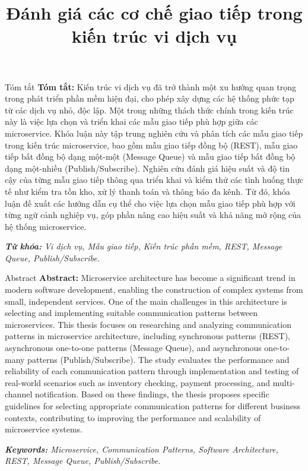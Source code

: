 \documentclass{uetgraduation}
\title{Đánh giá các cơ chế giao tiếp trong kiến trúc vi dịch vụ}
\begin{document}
\makecovers

\begin{preamble}{Tóm tắt}
    \textbf{Tóm tắt:} Kiến trúc vi dịch vụ đã trở thành  một xu hướng quan trọng trong phát triển phần mềm hiện đại, cho phép xây dựng các hệ thống phức tạp từ các dịch vụ nhỏ, độc lập. Một trong những thách thức chính trong kiến trúc này là việc lựa chọn và triển khai các mẫu giao tiếp phù hợp giữa các microservice. Khóa luận này tập trung nghiên cứu và phân tích các mẫu giao tiếp trong kiến trúc microservice, bao gồm mẫu giao tiếp đồng bộ (REST), mẫu giao tiếp bất đồng bộ dạng một-một (Message Queue) và mẫu giao tiếp bất đồng bộ dạng một-nhiều (Publish/Subscribe). Nghiên cứu đánh giá hiệu suất và độ tin cậy của từng mẫu giao tiếp thông qua triển khai và kiểm thử các tình huống thực tế như kiểm tra tồn kho, xử lý thanh toán và thông báo đa kênh. Từ đó, khóa luận đề xuất các hướng dẫn cụ thể cho việc lựa chọn mẫu giao tiếp phù hợp với từng ngữ cảnh nghiệp vụ, góp phần nâng cao hiệu suất và khả năng mở rộng của hệ thống microservice.

    \textit{\textbf{Từ khóa:} Vi dịch vụ, Mẫu giao tiếp, Kiến trúc phần mềm, REST, Message Queue, Publish/Subscribe.}
\end{preamble}

\begin{preamble}{Abstract}
    \textbf{Abstract:} Microservice architecture has become a significant trend in modern software development, enabling the construction of complex systems from small, independent services. One of the main challenges in this architecture is selecting and implementing suitable communication patterns between microservices. This thesis focuses on researching and analyzing communication patterns in microservice architecture, including synchronous patterns (REST), asynchronous one-to-one patterns (Message Queue), and asynchronous one-to-many patterns (Publish/Subscribe). The study evaluates the performance and reliability of each communication pattern through implementation and testing of real-world scenarios such as inventory checking, payment processing, and multi-channel notification. Based on these findings, the thesis proposes specific guidelines for selecting appropriate communication patterns for different business contexts, contributing to improving the performance and scalability of microservice systems.

    \textit{\textbf{Keywords:} Microservice, Communication Patterns, Software Architecture, REST, Message Queue, Publish/Subscribe.}
\end{preamble}
\end{document}
